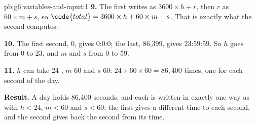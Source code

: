 \begin{solution}{pb:g6:variables-and-input:1}
\textbf{9.} The first  writes  as $3600 \times h + r$, then
$r$ as $60 \times m + s$, so $\code{total} = 3600 \times h + 60 \times m + s$.
That is exactly what the second  computes.

\textbf{10.} The first second, 0, gives 0:0:0; the last, 86,399, gives
23:59:59. So $h$ goes from 0 to 23, and $m$ and $s$ from 0 to 59.

\textbf{11.} $h$ can take 24 , $m$ 60 and $s$ 60: $24 \times 60 \times
60 = 86{,}400$ times, one for each second of the day.

\label{out:g6:variables-and-input:day}

\textbf{Result.} A day holds 86,400 seconds, and each is written in exactly one
way as  with $h < 24$, $m < 60$ and $s < 60$: the first 
gives a different time to each second, and the second  gives back the
second from its time.
\end{solution}
